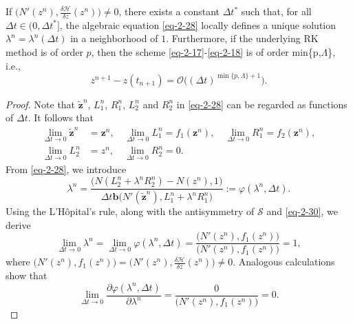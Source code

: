\documentclass[10pt,a4paper]{amsart}
\begin{document}
\begin{theorem}\label{Th-2-6}
If $\big(N'(z^n),\frac{\delta\mathcal{H}}{\delta z}(z^n)\big)\neq0$, there exists a constant $\Delta t^*$ such that, for all $\Delta t\in(0,\Delta t^*]$, the algebraic equation \eqref{eq-2-28} locally defines a unique solution $\lambda^n=\lambda^n(\Delta t)$ in a neighborhood of $1$. Furthermore, if the underlying RK method is of order $p$, then the scheme \eqref{eq-2-17}-\eqref{eq-2-18} is of order \mbox{min}\{p,$\Lambda$\}, i.e.,
\begin{equation}\label{eq-2-29}
	z^{n+1}-z(t_{n+1})=\mathcal{O}\big((\Delta t)^{\min\{p,\Lambda\}+1}\big).
\end{equation}
\end{theorem}

\begin{proof}
Note that $\tilde{\textbf{z}}^n$, $L_1^n$, $R_1^n$, $L_2^n$ and $R_2^n$ in \eqref{eq-2-28} can be regarded as functions of $\Delta t$. It follows that
\begin{equation}\label{eq-2-30}
	\begin{aligned}
	\lim_{\Delta t\rightarrow 0}\tilde{\textbf{z}}^n&=\textbf{z}^n,\quad\lim_{\Delta t\rightarrow 0}L_1^n=f_1(\textbf{z}^n),\quad \lim_{\Delta t\rightarrow 0}R_1^n=f_2(\textbf{z}^n),\\
    \lim_{\Delta t\rightarrow 0}L_2^n&=z^n,\quad \lim_{\Delta t\rightarrow 0}R_2^n=0.
	\end{aligned}
\end{equation}
From \eqref{eq-2-28}, we introduce
\begin{equation}\label{eq-2-31}
	\lambda^n=\frac{\big(N(L_2^n+\lambda^nR_2^n)-N(z^n),1\big)}{\Delta t\textbf{b}\big(N'(\tilde{\textbf{z}}^n),L_1^n+\lambda^nR_1^n\big)}:=\varphi(\lambda^n,\Delta t).
\end{equation}
Using the L'H\^{o}pital's rule, along with the antisymmetry of $\mathcal{S}$ and \eqref{eq-2-30}, we derive
\begin{equation}\label{eq-2-32}
	\lim_{\Delta t\rightarrow 0}\lambda^n=\lim_{\Delta t\rightarrow 0}\varphi(\lambda^n,\Delta t)=\frac{\big(N'(z^n),f_1(z^n)\big)}{\big(N'(z^n),f_1(z^n)\big)}=1,
\end{equation}	
where $\big(N'(z^n),f_1(z^n)\big)=\big(N'(z^n),\frac{\delta\mathcal{H}}{\delta z}(z^n)\big)\neq0$. Analogous calculations show that
\begin{equation*}
	\lim_{\Delta t\rightarrow 0}\frac{\partial\varphi(\lambda^n,\Delta t)}{\partial\lambda^n}=\frac{0}{\big(N'(z^n),f_1(z^n)\big)}=0.

\end{equation*}
\end{proof}
\end{document}
